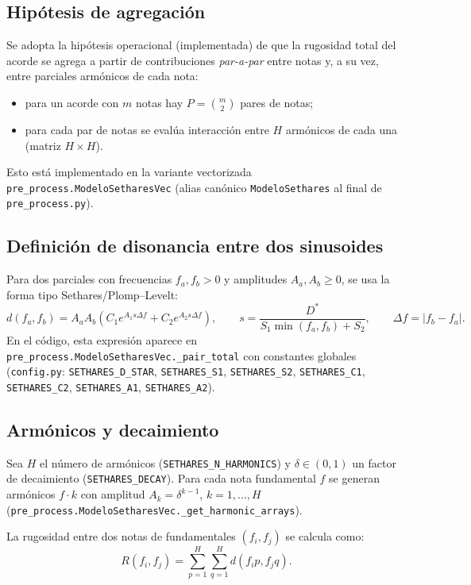 \subsection{Hipótesis de agregación}
Se adopta la hipótesis operacional (implementada) de que la rugosidad total del acorde se agrega a partir de contribuciones \emph{par-a-par} entre notas y, a su vez, entre parciales armónicos de cada nota:
\begin{itemize}
  \item para un acorde con $m$ notas hay $P=\binom{m}{2}$ pares de notas;
  \item para cada par de notas se evalúa interacción entre $H$ armónicos de cada una (matriz $H\times H$).
\end{itemize}
Esto está implementado en la variante vectorizada \texttt{pre\_process.ModeloSetharesVec} (alias canónico \texttt{ModeloSethares} al final de \texttt{pre\_process.py}).

\subsection{Definición de disonancia entre dos sinusoides}
Para dos parciales con frecuencias $f_a,f_b>0$ y amplitudes $A_a,A_b\ge 0$, se usa la forma tipo Sethares/Plomp--Levelt:
\[
d(f_a,f_b)=A_aA_b\left(C_1e^{A_1 s\Delta f}+C_2e^{A_2 s\Delta f}\right),
\qquad
s=\frac{D^{*}}{S_1\min(f_a,f_b)+S_2},
\qquad
\Delta f=|f_b-f_a|.
\]
En el código, esta expresión aparece en \texttt{pre\_process.ModeloSetharesVec.\_pair\_total} con constantes globales (\texttt{config.py}: \texttt{SETHARES\_D\_STAR}, \texttt{SETHARES\_S1}, \texttt{SETHARES\_S2}, \texttt{SETHARES\_C1}, \texttt{SETHARES\_C2}, \texttt{SETHARES\_A1}, \texttt{SETHARES\_A2}).

\subsection{Armónicos y decaimiento}
Sea $H$ el número de armónicos (\texttt{SETHARES\_N\_HARMONICS}) y $\delta\in(0,1)$ un factor de decaimiento (\texttt{SETHARES\_DECAY}). Para cada nota fundamental $f$ se generan armónicos $f\cdot k$ con amplitud $A_k=\delta^{k-1}$, $k=1,\dots,H$ (\texttt{pre\_process.ModeloSetharesVec.\_get\_harmonic\_arrays}).

La rugosidad entre dos notas de fundamentales $(f_i,f_j)$ se calcula como:
\[
R(f_i,f_j)=\sum_{p=1}^{H}\sum_{q=1}^{H} d(f_i p, f_j q).
\]

